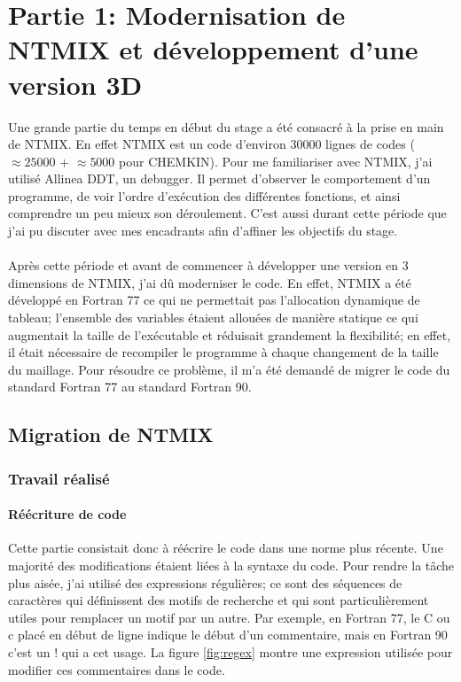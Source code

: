 \section{Partie 1: Modernisation de NTMIX et développement d'une version 3D}
Une grande partie du temps en début du stage a été consacré à la prise en main de NTMIX. En effet NTMIX est un code d'environ 30000 lignes de codes ($\approx 25000$ + $\approx 5000$ pour CHEMKIN). Pour me familiariser avec NTMIX, j'ai utilisé Allinea DDT, un debugger. Il permet d'observer le comportement d'un programme, de voir l'ordre d'exécution des différentes fonctions, et ainsi comprendre un peu mieux son déroulement. C'est aussi durant cette période que j'ai pu discuter avec mes encadrants afin d'affiner les objectifs du stage.

\paragraph{}
Après cette période et avant de commencer à développer une version en 3 dimensions de NTMIX, j'ai dû moderniser le code. En effet, NTMIX a été développé en Fortran 77 ce qui ne permettait pas l'allocation dynamique de tableau; l'ensemble des variables étaient allouées de manière statique ce qui augmentait la taille de l'exécutable et réduisait grandement la flexibilité; en effet, il était nécessaire de recompiler le programme à chaque changement de la taille du maillage. Pour résoudre ce problème, il m'a été demandé de migrer le code du standard Fortran 77 au standard Fortran 90.

\subsection{Migration de NTMIX}
\subsubsection{Travail réalisé}

\paragraph{Réécriture de code}Cette partie consistait donc à réécrire le code dans une norme plus récente. Une majorité des modifications étaient liées à la syntaxe du code. Pour rendre la tâche plus aisée, j'ai utilisé des expressions régulières; ce sont des séquences de caractères qui définissent des motifs de recherche et qui sont particulièrement utiles pour remplacer un motif par un autre. Par exemple, en Fortran 77, le C ou c placé en début de ligne indique le début d'un commentaire, mais en Fortran 90 c'est un ! qui a cet usage. La figure \ref{fig:regex} montre une expression utilisée pour modifier ces commentaires dans le code.

